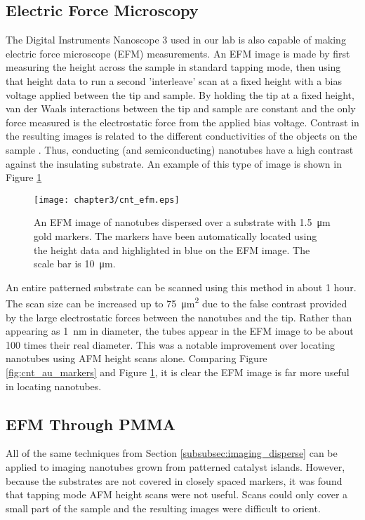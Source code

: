 \subsection{Electric Force Microscopy}

The Digital Instruments Nanoscope 3 used in our lab is also capable of making electric force microscope (EFM) measurements. An EFM image is made by first measuring the height across the sample in standard tapping mode, then using that height data to run a second 'interleave' scan at a fixed height with a bias voltage applied between the tip and sample. By holding the tip at a fixed height, van der Waals interactions between the tip and sample are constant and the only force measured is the electrostatic force from the applied bias voltage. Contrast in the resulting images is related to the different conductivities of the objects on the sample \cite{Bockrath2002}. Thus, conducting (and semiconducting) nanotubes have a high contrast against the insulating  substrate. An example of this type of image is shown in Figure \ref{fig:cnt_efm}

\begin{figure}
	\centering
	\texttt{[image: chapter3/cnt\_efm.eps]}
	\caption{An EFM image of nanotubes dispersed over a substrate with \SI{1.5}{\micro\meter} gold markers. The markers have been automatically located using the height data and highlighted in blue on the EFM image. The scale bar is \SI{10}{\micro\meter}.}
	\label{fig:cnt_efm}
\end{figure}

An entire patterned substrate can be scanned using this method in about 1 hour. The scan size can be increased up to \SI{75}{\square\micro\meter} due to the false contrast provided by the large electrostatic forces between the nanotubes and the tip. Rather than appearing as \SI{1}{\nano\meter} in diameter, the tubes appear in the EFM image to be about 100 times their real diameter. This was a notable improvement over locating nanotubes using AFM height scans alone. Comparing Figure \ref{fig:cnt_au_markers} and Figure \ref{fig:cnt_efm}, it is clear the EFM image is far more useful in locating nanotubes.

\subsection{EFM Through PMMA}

All of the same techniques from Section \ref{subsubsec:imaging_disperse} can be applied to imaging nanotubes grown from patterned catalyst islands. However, because the substrates are not covered in closely spaced markers, it was found that tapping mode AFM height scans were not useful. Scans could only cover a small part of the sample and the resulting images were difficult to orient.

